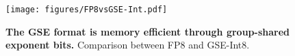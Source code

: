 \begin{figure}[t]
    \centering
    \texttt{[image: figures/FP8vsGSE-Int.pdf]}
    \caption{\textbf{The GSE format is memory efficient through group-shared exponent bits.} Comparison between FP8 and GSE-Int8.}
    \label{fig:comparison_format}
    \vspace{-4mm}
\end{figure}